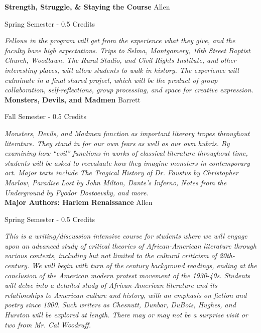 \noindent\textbf{Strength, Struggle, \& Staying the Course} \hfill Allen

\noindent Spring Semester - 0.5 Credits

\vspace{1mm}\emph{Fellows in the program will get from the experience what they give, and the faculty have high expectations. Trips to Selma, Montgomery, 16th Street Baptist Church, Woodlawn, The Rural Studio, and Civil Rights Institute, and other interesting places, will allow students to walk in history. The experience will culminate in a final shared project, which will be the product of group collaboration, self-reflections, group processing, and space for creative expression. }\\

\noindent\textbf{Monsters, Devils, and Madmen} \hfill Barrett

\noindent Fall Semester - 0.5 Credits

\vspace{1mm}\emph{Monsters, Devils, and Madmen function as important literary tropes throughout literature.  They stand in for our own fears as well as our own hubris.  By examining how ``evil'' functions in works of classical literature throughout time, students will be asked to reevaluate how they imagine monsters in contemporary art.  Major texts include The Tragical History of Dr. Faustus by Christopher Marlow, Paradise Lost by John Milton, Dante's Inferno, Notes from the Underground by Fyodor Dostoevsky, and more.}\\

\noindent\textbf{Major Authors: Harlem Renaissance} \hfill Allen

\noindent Spring Semester - 0.5 Credits

\vspace{1mm}\emph{This is a writing/discussion intensive course for students where we will engage upon an advanced study of critical theories of African-American literature through various contexts, including but not limited to the cultural criticism of 20th-century. We will begin with turn of the century background readings, ending at the conclusion of the American modern protest movement of the 1930-40s. Students will delve into a detailed study of African-American literature and its relationships to American culture and history, with an emphasis on fiction and poetry since 1900. Such writers as Chesnutt, Dunbar, DuBois, Hughes, and Hurston will be explored at length. There may or may not be a surprise visit or two from Mr. Cal Woodruff.}\\

